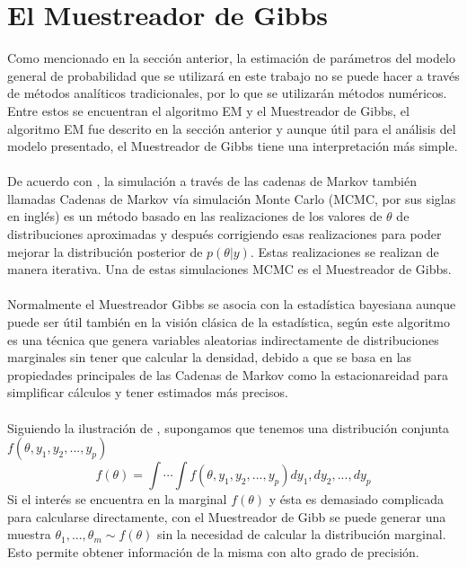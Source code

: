 \section{El Muestreador de Gibbs}
Como mencionado en la secci\'on anterior, la estimaci\'on de par\'ametros del modelo general de probabilidad que se utilizar\'a en este trabajo no se puede hacer a trav\'es de m\'etodos anal\'iticos tradicionales, por lo que se utilizar\'an m\'etodos num\'ericos. Entre estos se encuentran el algoritmo EM y el Muestreador de Gibbs, el algoritmo EM fue descrito en la secci\'on anterior y aunque \'util para el an\'alisis del modelo presentado, el Muestreador de Gibbs tiene una interpretaci\'on m\'as simple.\\
\\
De acuerdo con \cite{gelman2014bayesian}, la simulaci\'on a trav\'es de las cadenas de Markov tambi\'en llamadas Cadenas de Markov v\'ia simulaci\'on Monte Carlo (MCMC, por sus siglas en ingl\'es) es un m\'etodo basado en las realizaciones de los valores de $\theta$ de distribuciones aproximadas y despu\'es corrigiendo esas realizaciones para poder mejorar la distribuci\'on posterior de $p(\theta|y)$. Estas realizaciones se realizan de manera iterativa. Una de estas simulaciones MCMC es el Muestreador de Gibbs.\\
\\
Normalmente el Muestreador Gibbs se asocia con la estad\'istica bayesiana aunque puede ser \'util tambi\'en en la visi\'on cl\'asica de la estad\'istica, seg\'un \cite{casella1992explaining} este algoritmo es una t\'ecnica que genera variables aleatorias indirectamente de distribuciones marginales sin tener que calcular la densidad, debido a que se basa en las propiedades principales de las Cadenas de Markov como la estacionareidad para simplificar c\'alculos y tener estimados m\'as precisos.\\
\\
Siguiendo la ilustraci\'on de \cite{casella1992explaining}, supongamos que tenemos una distribuci\'on conjunta $f(\theta,y_1,y_2,...,y_p)$\\
\[f(\theta)=\int \cdots \int f(\theta,y_1,y_2,...,y_p) dy_1,dy_2,...,dy_p\]
Si el inter\'es se encuentra en la marginal $f(\theta)$ y \'esta es demasiado complicada para calcularse directamente, con el Muestreador de Gibb se puede generar una muestra $\theta_1,...,\theta_m \sim f(\theta)$ sin la necesidad de calcular la distribuci\'on marginal. Esto permite obtener informaci\'on de la misma con alto grado de precisi\'on.\\
